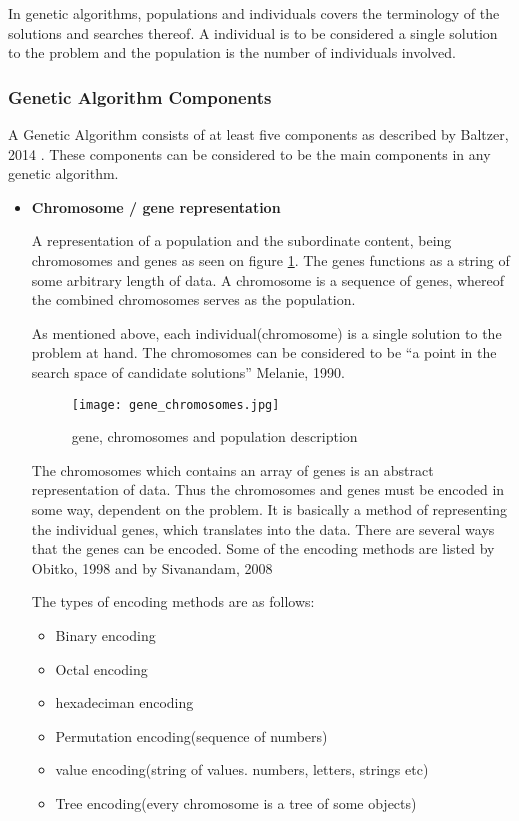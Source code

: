 In genetic algorithms, populations and individuals covers the terminology of the solutions and searches thereof. A individual is to be considered a single solution to the problem and the population is the number of individuals involved. \cite[pp. 39]{Sivanandam2008}



\subsubsection{Genetic Algorithm Components}

A Genetic Algorithm consists of at least five components as described by Baltzer, 2014 \cite{Baltzer2014}. These components can be considered to be the main components in any genetic algorithm.
\begin{itemize}
\item \textbf{Chromosome / gene representation}

A representation of a population and the subordinate content, being chromosomes and genes as seen on figure \ref{fig:gene}.
The genes functions as a string of some arbitrary length of data. A chromosome is a sequence of genes, whereof the combined chromosomes serves as the population. \cite[pp. 41]{Sivanandam2008}

As mentioned above, each individual(chromosome) is a single solution to the problem at hand. The chromosomes can be considered to be \enquote{a point in the search space of candidate solutions} \cite[pp. 7]{Melanie1990} Melanie, 1990.


\begin{figure}[!h]
\centering
\texttt{[image: gene\_chromosomes.jpg]}
\caption{gene, chromosomes and population description}
\label{fig:gene}
\end{figure}

The chromosomes which contains an array of genes is an abstract representation of data. Thus the chromosomes and genes must be encoded in some way, dependent on the problem. It is basically a method of representing the individual genes, which translates into the data.
There are several ways that the genes can be encoded. Some of the encoding methods are listed by Obitko, 1998 \cite{Marek1998} and by Sivanandam, 2008 \cite[pp. 43]{Sivanandam2008}

The types of encoding methods are as follows:
\begin{itemize}
\item Binary encoding
\item Octal encoding
\item hexadeciman encoding
\item Permutation encoding(sequence of numbers)
\item value encoding(string of values. numbers, letters, strings etc)
\item Tree encoding(every chromosome is a tree of some objects)
\end{itemize}



\end{itemize}
